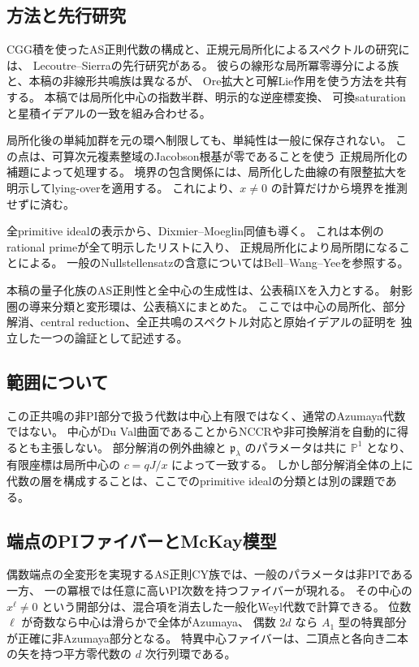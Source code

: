\subsection{方法と先行研究}

CGG積を使ったAS正則代数の構成と、正規元局所化によるスペクトルの研究には、
Lecoutre--Sierra\cite{LecoutreSierra2019}の先行研究がある。
彼らの線形な局所冪零導分による族と、本稿の非線形共鳴族は異なるが、
Ore拡大と可解Lie作用を使う方法を共有する。
本稿では局所化中心の指数半群、明示的な逆座標変換、
可換saturationと星積イデアルの一致を組み合わせる。

局所化後の単純加群を元の環へ制限しても、単純性は一般に保存されない。
この点は、可算次元複素整域のJacobson根基が零であることを使う
正規局所化の補題によって処理する。
境界の包含関係には、局所化した曲線の有限整拡大を明示してlying-overを適用する。
これにより、$x\ne0$ の計算だけから境界を推測せずに済む。

全primitive idealの表示から、Dixmier--Moeglin同値も導く。
これは本例のrational primeが全て明示したリストに入り、
正規局所化により局所閉になることによる。
一般のNullstellensatzの含意についてはBell--Wang--Yee\cite{BellWangYee2019}を参照する。

本稿の量子化族のAS正則性と全中心の生成性は、公表稿IX\cite{VKPoisson34}を入力とする。
射影圏の導来分類と変形環は、公表稿X\cite{VKCategories36}にまとめた。
ここでは中心の局所化、部分解消、central reduction、全正共鳴のスペクトル対応と原始イデアルの証明を
独立した一つの論証として記述する。

\subsection{範囲について}

この正共鳴の非PI部分で扱う代数は中心上有限ではなく、通常のAzumaya代数ではない。
中心がDu Val曲面であることからNCCRや非可換解消を自動的に得るとも主張しない。
部分解消の例外曲線と $\mathfrak p_\lambda$ のパラメータは共に $\mathbb P^1$ となり、
有限座標は局所中心の $c=qJ/x$ によって一致する。
しかし部分解消全体の上に代数の層を構成することは、ここでのprimitive idealの分類とは別の課題である。

\subsection{端点のPIファイバーとMcKay模型}

偶数端点の全変形を実現するAS正則CY族では、一般のパラメータは非PIである一方、
一の冪根では任意に高いPI次数を持つファイバーが現れる。
その中心の $x^\ell\ne0$ という開部分は、混合項を消去した一般化Weyl代数で計算できる。
位数 $\ell$ が奇数なら中心は滑らかで全体がAzumaya、
偶数 $2d$ なら $A_1$ 型の特異部分が正確に非Azumaya部分となる。
特異中心ファイバーは、二頂点と各向き二本の矢を持つ平方零代数の $d$ 次行列環である。

